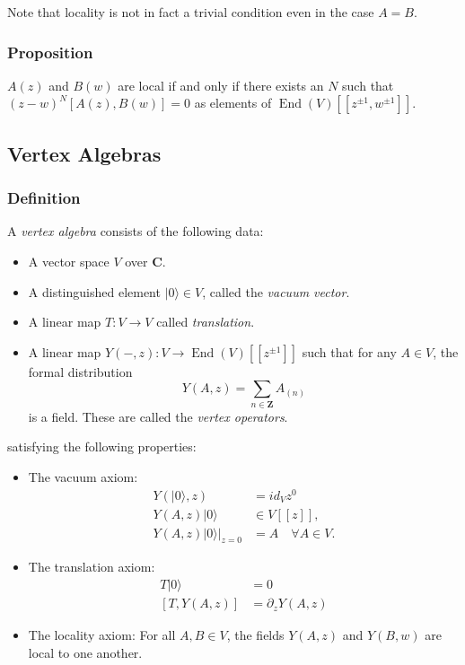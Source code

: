 \documentclass{article}
\newcommand{\CC}{\mathbold{C}}
\newcommand{\ZZ}{\mathbold{Z}}
\newcommand{\vac}{|0\rangle}
\DeclareMathOperator{\End}{End}
\begin{document}
Note that locality is not in fact a trivial condition even in the case $A=B$.

\subsubsection{Proposition}
$A(z)$ and $B(w)$ are local if and only if there exists an $N$ such that $(z-w)^N[A(z),B(w)]=0$ as elements of $\End(V)[[z^{\pm 1},w^{\pm 1}]]$.

\subsection{Vertex Algebras}

\subsubsection{Definition}
A \textit{vertex algebra} consists of the following data:
\begin{itemize}
\item A vector space $V$ over $\CC$.
\item A distinguished element $\vac \in V$, called the \textit{vacuum vector}.
\item A linear map $T: V \rightarrow V$ called \textit{translation}.
\item A linear map $Y(-,z): V \rightarrow \End(V)[[z^{\pm 1}]]$ such that for any $A \in V$, the formal distribution
  \[Y(A,z)=\sum_{n \in \ZZ} A_{(n)} \]
  is a field.  These are called the \textit{vertex operators}.
\end{itemize}
satisfying the following properties:
\begin{itemize}
\item The vacuum axiom:
  \begin{align}
    Y(\vac,z)&=id_Vz^0\\
    Y(A,z)\vac &\in V[[z]],\\
    Y(A,z)\vac|_{z=0}&=A\quad \forall A \in V.
  \end{align}
\item The translation axiom:
  \begin{align}
    T \vac &= 0\\
    [T,Y(A,z)]&=\partial_z Y(A,z)
  \end{align}
\item The locality axiom: For all $A,B \in V$, the fields $Y(A,z)$ and $Y(B,w)$ are local to one another.
\end{itemize}
\end{document}
